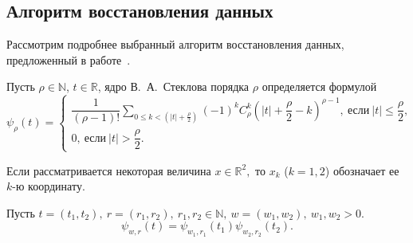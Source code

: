 

\label{sec:func_recv}


\subsection*{Алгоритм восстановления данных}



Рассмотрим подробнее выбранный алгоритм восстановления данных,
предложенный в работе~\cite{book_Zhuk}. 



Пусть
$ \rho \in \mathbb{N}$, $t\in\mathbb{R}$, 
ядро В.~А.~Стеклова порядка $\rho$ определяется формулой
\begin{equation}
    \label{eq:psi_common}
    \psi_{\rho}(t)=
    \begin{cases}
      \dfrac{1}{(\rho-1)!}\sum\limits_{0\leqslant k<\left(|t|+\frac{\rho}{2}\right)}(-1)^kC_{\rho}^k\left(|t|+\dfrac{\rho}{2}-k\right)^{\rho-1},\ \text{если}\ |t|\leqslant \dfrac{\rho}{2},\\
     0,\ \text{если}\ |t| > \dfrac{\rho}{2}.
    \end{cases} 
\end{equation}

Если рассматривается некоторая величина $x\in\mathbb{R}^2,$ то
$x_k$ ($k=1,2$) обозначает ее $k$-ю координату.
 
Пусть $t=(t_1,t_2),\ r=(r_1,r_2),\ r_1,r_2 \in \mathbb{N},\  w = (w_1,w_2),\ w_1,w_2 > 0.$
    \begin{equation*}
      \psi_{w,r}(t)=\psi_{w_1,r_1}(t_1)\psi_{w_2,r_2}(t_2).
    \end{equation*}



